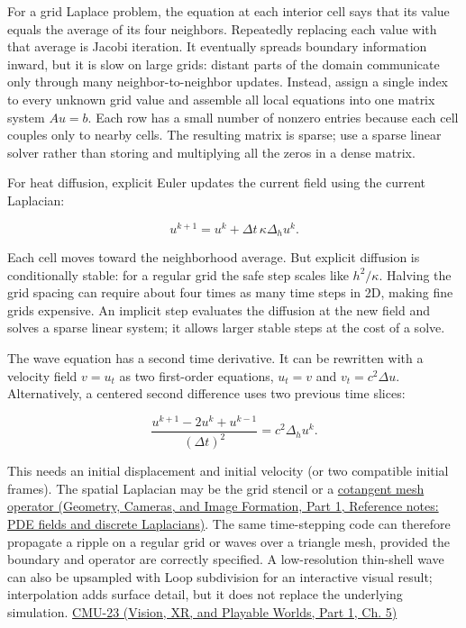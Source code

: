 \hypertarget{04-visual-computing-ii-ch030-turn-the-discretized-equations-into-a-solver}{}

For a grid Laplace problem, the equation at each interior cell says that its value equals the average of its four neighbors. Repeatedly replacing each value with that average is Jacobi iteration. It eventually spreads boundary information inward, but it is slow on large grids: distant parts of the domain communicate only through many neighbor-to-neighbor updates. Instead, assign a single index to every unknown grid value and assemble all local equations into one matrix system \(Au=b\). Each row has a small number of nonzero entries because each cell couples only to nearby cells. The resulting matrix is sparse; use a sparse linear solver rather than storing and multiplying all the zeros in a dense matrix.

For heat diffusion, explicit Euler updates the current field using the current Laplacian:

\[
u^{k+1}=u^k+\Delta t\,\kappa\Delta_h u^k.
\]

Each cell moves toward the neighborhood average. But explicit diffusion is conditionally stable: for a regular grid the safe step scales like \(h^2/\kappa\). Halving the grid spacing can require about four times as many time steps in 2D, making fine grids expensive. An implicit step evaluates the diffusion at the new field and solves a sparse linear system; it allows larger stable steps at the cost of a solve.

The wave equation has a second time derivative. It can be rewritten with a velocity field \(v=u_t\) as two first-order equations, \(u_t=v\) and \(v_t=c^2\Delta u\). Alternatively, a centered second difference uses two previous time slices:

\[
\frac{u^{k+1}-2u^k+u^{k-1}}{(\Delta t)^2}=c^2\Delta_h u^k.
\]

This needs an initial displacement and initial velocity (or two compatible initial frames). The spatial Laplacian may be the grid stencil or a \href{../03-Geometry-Cameras-and-Image-Formation-P01/main.pdf\#nameddest=appendix-1988d465c119}{cotangent mesh operator (Geometry, Cameras, and Image Formation, Part 1, Reference notes: PDE fields and discrete Laplacians)}. The same time-stepping code can therefore propagate a ripple on a regular grid or waves over a triangle mesh, provided the boundary and operator are correctly specified. A low-resolution thin-shell wave can also be upsampled with Loop subdivision for an interactive visual result; interpolation adds surface detail, but it does not replace the underlying simulation. \href{../07-Vision-XR-and-Playable-Worlds-P01/main.pdf\#nameddest=04-visual-computing-ii-ch036-cmu-23---physically-based-animation-and-pdes}{CMU-23 (Vision, XR, and Playable Worlds, Part 1, Ch. 5)}

